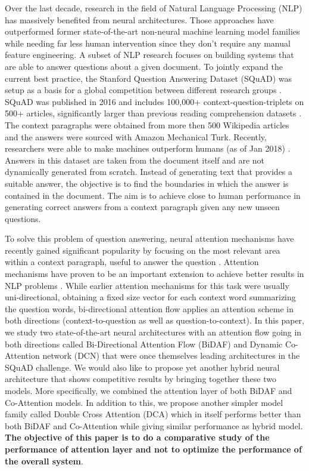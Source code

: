 \documentclass{article} %
\begin{document}
Over the last decade, research in the field of Natural Language Processing (NLP) has massively benefited from neural architectures. Those approaches have outperformed former state-of-the-art non-neural machine learning model families while needing far less human intervention since they don't require any manual feature engineering. A subset of NLP research focuses on building systems that are able to answer questions about a given document. To jointly expand the current best practice, the Stanford Question Answering Dataset (SQuAD) was setup as a basis for a global competition between different research groups \cite{squad}. SQuAD was published in 2016 and includes 100,000+ context-question-triplets on 500+ articles, significantly larger than previous reading comprehension datasets \cite{squad2}. The context paragraphs were obtained from more then 500 Wikipedia articles and the answers were sourced with Amazon Mechanical Turk. Recently, researchers were able to make machines outperform humans (as of Jan 2018) \cite{squad2}. Answers in this dataset are taken from the document itself and are not dynamically generated from scratch. Instead of generating text that provides a suitable answer, the objective is to find the boundaries in which the answer is contained in the document. The aim is to achieve close to human performance in generating correct answers from a context paragraph given any new unseen questions.

To solve this problem of question answering, neural attention mechanisms have recently gained significant popularity by focusing on the most relevant area within a context paragraph, useful to answer the question \cite{weston, xiong}. Attention mechanisms have proven to be an important extension to achieve better results in NLP problems \cite{mitry}.
While earlier attention mechanisms for this task were usually uni-directional, obtaining a fixed size vector for each context word summarizing the question words, bi-directional attention flow applies an attention scheme in both directions (context-to-question as well as question-to-context). In this paper, we study two state-of-the-art neural architectures with an attention flow going in both directions called Bi-Directional Attention Flow (BiDAF) \cite{bidaf} and Dynamic Co-Attention network (DCN) \cite{coatten} that were once themselves leading architectures in the SQuAD challenge. We would also like to propose yet another hybrid neural architecture that shows competitive results by bringing together these two models. More specifically, we combined the attention layer of both BiDAF and Co-Attention models. In addition to this, we propose another simpler model family called Double Cross Attention (DCA) which in itself performs better than both BiDAF and Co-Attention while giving similar performance as hybrid model. {\bf The objective of this paper is to do a comparative study of the performance of attention layer and not to optimize the performance of the overall system}. 
 
\end{document}
